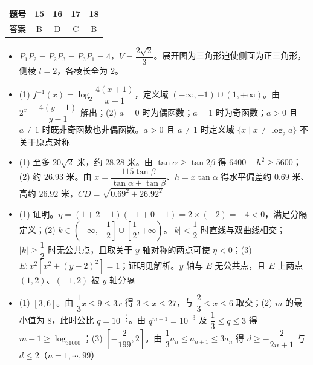 \begin{center}\begin{tabular}{ccccc}
\toprule
题号 & 15 & 16 & 17 & 18 \\
\midrule
答案 & B & D & C & B \\
\bottomrule
\end{tabular}\end{center}

\begin{itemize}[leftmargin=2.6em]
  \item[\textbf{19.}] $P_1P_2=P_2P_3=P_3P_1=4$，$V=\dfrac{2\sqrt2}3$。展开图为三角形迫使侧面为正三角形，侧棱 $l=2$，各棱长全为 $2$。
  \item[\textbf{20.}] (1) $f^{-1}(x)=\log_2\dfrac{4(x+1)}{x-1}$，定义域 $(-\infty,-1)\cup(1,+\infty)$。由 $2^x=\dfrac{4(y+1)}{y-1}$ 解出；(2) $a=0$ 时为偶函数；$a=1$ 时为奇函数；$a>0$ 且 $a\neq1$ 时既非奇函数也非偶函数。$a>0$ 且 $a\neq1$ 时定义域 $\{x\mid x\neq\log_2a\}$ 不关于原点对称
  \item[\textbf{21.}] (1) 至多 $20\sqrt2$ 米，约 $28.28$ 米。由 $\tan\alpha\geqslant\tan2\beta$ 得 $6400-h^2\geqslant5600$；(2) 约 $26.93$ 米。由 $x=\dfrac{115\tan\beta}{\tan\alpha+\tan\beta}$、$h=x\tan\alpha$ 得水平偏差约 $0.69$ 米、高约 $26.92$ 米，$CD=\sqrt{0.69^2+26.92^2}$
  \item[\textbf{22.}] (1) 证明。$\eta=(1+2-1)(-1+0-1)=2\times(-2)=-4<0$，满足分隔定义；(2) $k\in\left(-\infty,-\dfrac12\right]\cup\left[\dfrac12,+\infty\right)$。$|k|<\dfrac12$ 时直线与双曲线相交；$|k|\geqslant\dfrac12$ 时无公共点，且取关于 $y$ 轴对称的两点可使 $\eta<0$；(3) $E:x^2\left[x^2+(y-2)^2\right]=1$；证明见解析。$y$ 轴与 $E$ 无公共点，且 $E$ 上两点 $(1,2)$、$(-1,2)$ 被 $y$ 轴分隔
  \item[\textbf{23.}] (1) $[3,6]$。由 $\dfrac13x\leqslant9\leqslant3x$ 得 $3\leqslant x\leqslant27$，与 $\dfrac23\leqslant x\leqslant6$ 取交；(2) $m$ 的最小值为 $8$，此时公比 $q=10^{-\frac37}$。由 $q^{m-1}=10^{-3}$ 及 $\dfrac13\leqslant q\leqslant3$ 得 $m-1\geqslant\log_31000$；(3) $\left[-\dfrac2{199},2\right]$。由 $\dfrac13a_n\leqslant a_{n+1}\leqslant3a_n$ 得 $d\geqslant-\dfrac2{2n+1}$ 与 $d\leqslant2$（$n=1,\cdots,99$）
\end{itemize}
